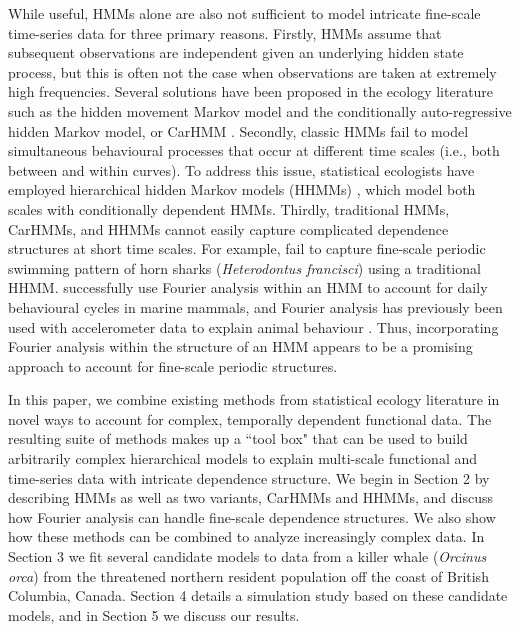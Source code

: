 While useful, HMMs alone are also not sufficient to model intricate fine-scale time-series data for three primary reasons.
%
Firstly, HMMs assume that subsequent observations are independent given an underlying hidden state process, but this is often not the case when observations are taken at extremely high frequencies. 
Several solutions have been proposed in the ecology literature such as the hidden movement Markov model \citep{Whoriskey:2016} and the conditionally auto-regressive hidden Markov model, or CarHMM \citep{Lawler:2019}. 
%
Secondly, classic HMMs fail to model simultaneous behavioural processes that occur at different time scales (i.e., both between and within curves). 
To address this issue, statistical ecologists have employed hierarchical hidden Markov models (HHMMs) \citep{Barajas:2017,Adam:2019}, which model both scales with conditionally dependent HMMs.
%
Thirdly, traditional HMMs, CarHMMs, and HHMMs cannot easily capture complicated dependence structures at short time scales. For example, \citet{Adam:2019} fail to capture fine-scale periodic swimming pattern of horn sharks (\textit{Heterodontus francisci}) using a traditional HHMM. \citet{Heerah:2017} successfully use Fourier analysis within an HMM to account for %
daily behavioural cycles in marine mammals, and Fourier analysis has previously been used with accelerometer data to explain animal behaviour \citep{Fehlmann:2017,Shorter:2017}. Thus, incorporating Fourier analysis within the structure of an HMM appears to be a promising approach to account for fine-scale periodic structures.

In this paper, we combine existing methods from statistical ecology literature in novel ways to account for complex, temporally dependent functional data. The resulting suite of methods makes up a ``tool box" that can be used to build arbitrarily complex hierarchical models to explain multi-scale functional and time-series data with intricate dependence structure.
We begin in Section 2 by describing HMMs as well as two variants, CarHMMs and HHMMs, and discuss how Fourier analysis can handle fine-scale dependence structures. We also show how these methods can be combined to analyze increasingly complex data. In Section 3 we fit several candidate models to data from a killer whale (\textit{Orcinus orca}) from the threatened northern resident population off the coast of British Columbia, Canada. Section 4 details a simulation study based on these candidate models, and in Section 5 we discuss our results.